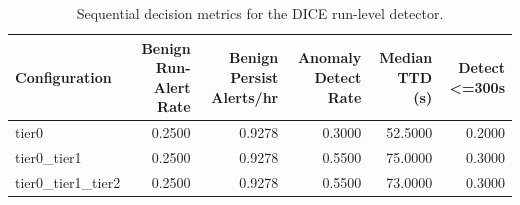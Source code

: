 \begin{table}[t]
\centering
\caption{Sequential decision metrics for the DICE run-level detector.}
\label{tab:dice_sequential_metrics}
\footnotesize
\begin{tabular}{lrrrrr}
\toprule
Configuration & Benign Run-Alert Rate & Benign Persist Alerts/hr & Anomaly Detect Rate & Median TTD (s) & Detect <=300s \\
\midrule
tier0 & 0.2500 & 0.9278 & 0.3000 & 52.5000 & 0.2000 \\
tier0_tier1 & 0.2500 & 0.9278 & 0.5500 & 75.0000 & 0.3000 \\
tier0_tier1_tier2 & 0.2500 & 0.9278 & 0.5500 & 73.0000 & 0.3000 \\
\bottomrule
\end{tabular}

\end{table}
